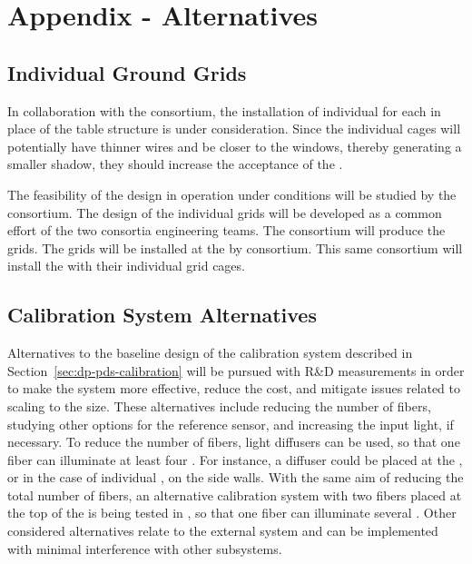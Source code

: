 \newpage

\section{Appendix - Alternatives}
\label{sec:dp-pds-appendix}

\subsection{Individual Ground Grids}
\label{sec:dp-pds-appendix-grid}

In collaboration with the  consortium, the installation of individual  for each  in place of the  table structure is under consideration. Since the individual  cages will potentially have thinner wires and be closer to the  windows, thereby generating a smaller shadow, they should increase the acceptance of the .

The feasibility of the design in operation under  conditions will be studied by the  consortium. The design of the individual grids will be developed as a common effort of the two consortia engineering teams. The  consortium will produce the grids. The grids will be installed at the  by   consortium. This same consortium will install the   %
with their individual grid cages. 

\subsection{Calibration System Alternatives}
\label{sec:dp-pds-appendix-calibration}

Alternatives to the baseline design of the calibration system described in Section~\ref{sec:dp-pds-calibration} will be pursued with R\&D measurements in order to make the system more effective, reduce the cost, and mitigate issues related to scaling to the  size. These alternatives include reducing the number of fibers, studying other options for the reference sensor, and increasing the input light, if necessary. To reduce the number of fibers, light diffusers can be used, so that one fiber can illuminate at least four . For instance, a diffuser could be placed at the , or in the case of individual , on the side walls. With the same aim of reducing the total number of fibers, an alternative calibration system with two fibers placed at the top of the  is being tested in , so that one fiber can illuminate several . Other %
considered alternatives relate to the external system and can be implemented with minimal interference with other subsystems.

